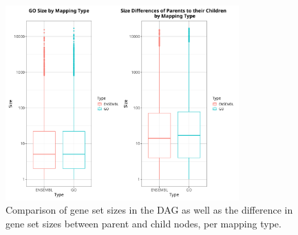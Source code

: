 \documentclass[12pt]{article}
\begin{document}
\begin{figure}[!htbp]
    \centering
    \includegraphics[width=0.8\textwidth]{./plots/goSizes.png}
    \caption{Comparison of gene set sizes in the DAG as well as the difference in gene set sizes between parent and child nodes, per mapping type.}
    \label{fig:-plots-goSizes-png}
\end{figure}
\end{document}
